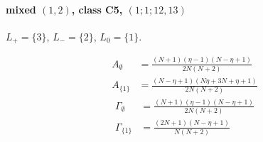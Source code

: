 \documentclass[11pt]{article}
\begin{document}
\paragraph{mixed $(1,2)$, class C5, $(1;1;12,13)$}

$L_+=\{3\}$, $L_-=\{2\}$, $L_0=\{1\}$.

\begin{align*}
  A_{\emptyset} &= \frac{\left(N + 1\right) \left(\eta - 1\right) \left(N - \eta + 1\right)}{2 N \left(N + 2\right)} \\
  A_{\{1\}} &= \frac{\left(N - \eta + 1\right) \left(N \eta + 3 N + \eta + 1\right)}{2 N \left(N + 2\right)} 
\end{align*}
\begin{align*}
  \Gamma_{\emptyset} &= \frac{\left(N + 1\right) \left(\eta - 1\right) \left(N - \eta + 1\right)}{2 N \left(N + 2\right)} \\
  \Gamma_{\{1\}} &= \frac{\left(2 N + 1\right) \left(N - \eta + 1\right)}{N \left(N + 2\right)} 
\end{align*}
\end{document}
